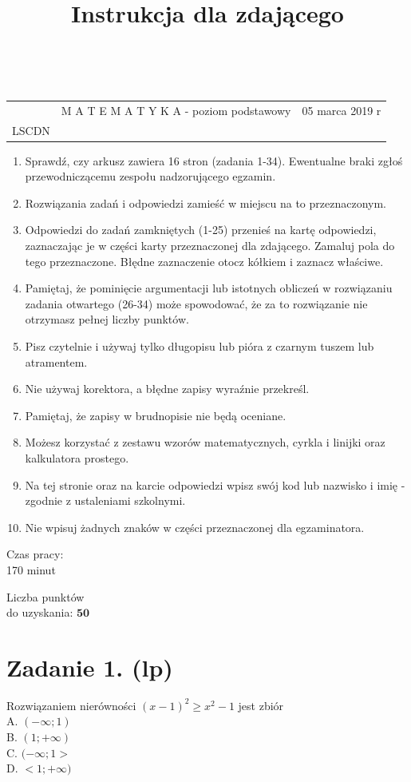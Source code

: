 \documentclass[10pt]{article}
\title{Instrukcja dla zdającego }
\author{}
\date{}
\begin{document}
\maketitle
\(\qquad\)

\begin{center}
\begin{tabular}{|l|l|l}
\hline
 & M A T E M A T Y K A - poziom podstawowy & 05 marca 2019 r \\
LSCDN &  &  \\
\hline
\end{tabular}
\end{center}

\begin{enumerate}
  \item Sprawdź, czy arkusz zawiera 16 stron (zadania 1-34). Ewentualne braki zgłoś przewodniczącemu zespołu nadzorującego egzamin.
  \item Rozwiązania zadań i odpowiedzi zamieść w miejscu na to przeznaczonym.
  \item Odpowiedzi do zadań zamkniętych (1-25) przenieś na kartę odpowiedzi, zaznaczając je w części karty przeznaczonej dla zdającego. Zamaluj pola do tego przeznaczone. Błędne zaznaczenie otocz kółkiem i zaznacz właściwe.
  \item Pamiętaj, że pominięcie argumentacji lub istotnych obliczeń w rozwiązaniu zadania otwartego (26-34) może spowodować, że za to rozwiązanie nie otrzymasz pełnej liczby punktów.
  \item Pisz czytelnie i używaj tylko długopisu lub pióra z czarnym tuszem lub atramentem.
  \item Nie używaj korektora, a błędne zapisy wyraźnie przekreśl.
  \item Pamiętaj, że zapisy w brudnopisie nie będą oceniane.
  \item Możesz korzystać z zestawu wzorów matematycznych, cyrkla i linijki oraz kalkulatora prostego.
  \item Na tej stronie oraz na karcie odpowiedzi wpisz swój kod lub nazwisko i imię - zgodnie z ustaleniami szkolnymi.
  \item Nie wpisuj żadnych znaków w części przeznaczonej dla egzaminatora.
\end{enumerate}

Czas pracy:\\
170 minut

Liczba punktów\\
do uzyskania: \(\mathbf{5 0}\)

\section*{Zadanie 1. (lp)}
Rozwiązaniem nierówności \((x-1)^{2} \geq x^{2}-1\) jest zbiór\\
A. \((-\infty ; 1)\)\\
B. \((1 ;+\infty)\)\\
C. \((-\infty ; 1>\)\\
D. \(<1 ;+\infty)\)
\end{document}
